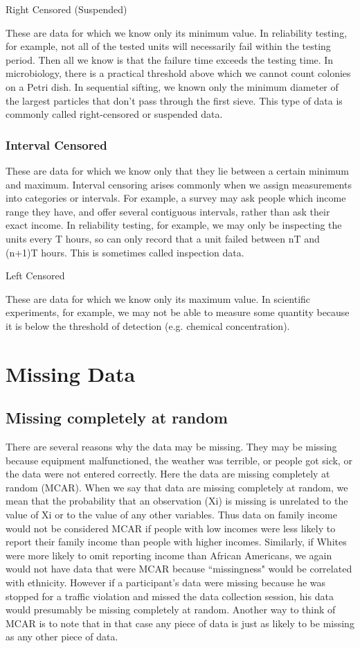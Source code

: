 \documentclass[12pt, a4paper]{report}
\begin{document}
Right Censored (Suspended)

These are data for which we know only its minimum value. In reliability testing, for example, not all of the tested units will necessarily fail within the testing period. Then all we know is that the failure time exceeds the testing time. In microbiology, there is a practical threshold above which we cannot count colonies on a Petri dish. In sequential sifting, we known only the minimum diameter of the largest particles that don't pass through the first sieve. This type of data is commonly called right-censored or suspended data.


\subsubsection{Interval Censored}

These are data for which we know only that they lie between a certain minimum and maximum. Interval censoring arises commonly when we assign measurements into categories or intervals. For example, a survey may ask people which income range they have, and offer several contiguous intervals, rather than ask their exact income. In reliability testing, for example, we may only be inspecting the units every T hours, so can only record that a unit failed between nT and (n+1)T hours. This is sometimes called inspection data.


Left Censored

These are data for which we know only its maximum value. In scientific experiments, for example, we may not be able to measure some quantity because it is below the threshold of detection (e.g. chemical concentration).


\section{Missing Data}


\subsection{Missing completely at random}
There are several reasons why the data may be missing. They may be missing because equipment malfunctioned, the weather was terrible, or people got sick, or the data were not entered correctly. Here the data are missing completely at random (MCAR). When we say that data are missing completely at random, we mean that the probability that an observation (Xi) is missing is unrelated to the value of Xi or to the value of any other variables. Thus data on family income would not be considered MCAR if people with low incomes were less likely to report their family income than people with higher incomes. Similarly, if Whites were more likely to omit reporting income than African Americans, we again would not have data that were MCAR because ``missingness" would be correlated with ethnicity. However if a participant's data were missing because he was stopped for a traffic violation and missed the data collection session, his data would presumably be missing completely at random. Another way to think of MCAR is to note that in that case any piece of data is just as likely to be missing as any other piece of data.
\end{document}
